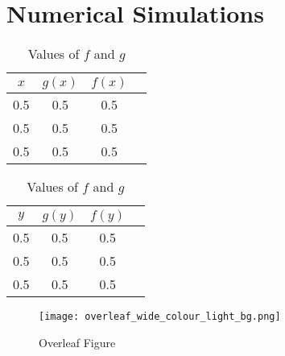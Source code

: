 \newpage
\chapter{Numerical Simulations}

\lipsum[7]

\begin{table}[h!]
\caption[Values of $f$ and $g$ at $x$ and $y$]{Values of $f$ and $g$}
\centering
\setlength{\tabcolsep}{5pt} %
\begin{tabular}{ c c c c } \toprule
$x$& $g(x)$ & $f(x)$  \\\midrule
0.5 & 0.5 & 0.5 \\[.5em]
0.5 & 0.5 & 0.5 \\[.5em]
0.5 & 0.5 & 0.5 \\[.5em]
\bottomrule
 \hline
\end{tabular}%
\qquad \begin{tabular}{ c c c c } \toprule
$y$& $g(y)$ & $f(y)$  \\\midrule
0.5 & 0.5 & 0.5 \\[.5em]
0.5 & 0.5 & 0.5 \\[.5em]
0.5 & 0.5 & 0.5 \\[.5em]
\bottomrule
 \hline
\end{tabular}
 \label{table:maxg}
\end{table}
\vspace{-10pt}

\lipsum[9]

\begin{figure}[!ht]
\texttt{[image: overleaf\_wide\_colour\_light\_bg.png]}
\caption{Overleaf Figure}
\label{fig:AFSexpall}
\end{figure}



